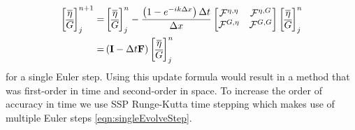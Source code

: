 \begin{align}
\label{eqn:singleEvolveStep}
\begin{bmatrix}
\overline{\eta} \\ \overline{G}
\end{bmatrix}^{n+1}_j =& \begin{bmatrix}
\overline{\eta} \\ \overline{G}
\end{bmatrix}^{n}_j - \frac{\left(1 - e^{-ik\Delta x}\right) \Delta t}{ \Delta x}\begin{bmatrix}
\mathcal{F}^{\eta,\eta} & \mathcal{F}^{\eta,G} \\\mathcal{F}^{G,\eta} &\mathcal{F}^{G,G} 
\end{bmatrix}\begin{bmatrix}
\overline{\eta} \\ \overline{G}
\end{bmatrix}^{n}_j \nonumber\\=& \left(\mathbf{I}  - \Delta t \mathbf{F} \right) \begin{bmatrix}
\overline{\eta} \\ \overline{G}
\end{bmatrix}^{n}_j
\end{align}
for a single Euler step. Using this update formula would result in a method that was first-order in time and second-order in space. To increase the order of accuracy in time we use SSP Runge-Kutta time stepping which makes use of multiple Euler steps \eqref{eqn:singleEvolveStep}.

